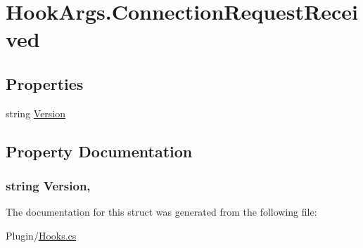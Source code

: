 \hypertarget{structOTA_1_1Plugin_1_1HookArgs_1_1ConnectionRequestReceived}{}\section{Hook\+Args.\+Connection\+Request\+Received}
\label{structOTA_1_1Plugin_1_1HookArgs_1_1ConnectionRequestReceived}
\subsection*{Properties}
\begin{DoxyCompactItemize}
\item 
string \hyperlink{structOTA_1_1Plugin_1_1HookArgs_1_1ConnectionRequestReceived_a8ca1a1a001dc102637530f1a11a83224}{Version}
\end{DoxyCompactItemize}


\subsection{Property Documentation}
\hypertarget{structOTA_1_1Plugin_1_1HookArgs_1_1ConnectionRequestReceived_a8ca1a1a001dc102637530f1a11a83224}{}
\subsubsection[{Version}]{\setlength{\rightskip}{0pt plus 5cm}string Version\hspace{0.3cm}{\ttfamily [get]}, {\ttfamily [set]}}\label{structOTA_1_1Plugin_1_1HookArgs_1_1ConnectionRequestReceived_a8ca1a1a001dc102637530f1a11a83224}


The documentation for this struct was generated from the following file\+:\begin{DoxyCompactItemize}
\item 
Plugin/\hyperlink{Hooks_8cs}{Hooks.\+cs}\end{DoxyCompactItemize}
